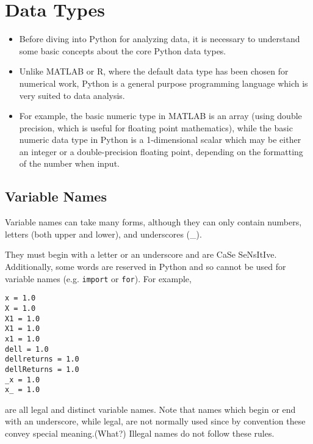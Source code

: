 \documentclass[KSmain.tex]{subfiles}
\begin{document}
 






\section{Data Types}
\begin{itemize}
\item Before diving into Python for analyzing data, it is necessary to 
understand some basic concepts about the core Python data types.

\item Unlike MATLAB or R, where the default data type has been chosen for numerical work, Python is 
 a general purpose programming language which is very suited to data analysis.

\item For example,
the basic numeric type in MATLAB is an array (using double precision, which is useful for floating point
mathematics), while the basic numeric data type in Python is a 1-dimensional scalar which may be either
an integer or a double-precision floating point, depending on the formatting of the number when input.
\end{itemize}

\subsection{ Variable Names}
Variable names can take many forms, although they can only contain numbers, letters (both upper and
lower), and underscores (\_). 

They must begin with a letter or an underscore and are CaSe SeNsItIve.
Additionally, some words are reserved in Python and so cannot be used for variable names (e.g. \texttt{import} or \texttt{for}). For example,

\begin{framed}
\begin{verbatim}
x = 1.0
X = 1.0
X1 = 1.0
X1 = 1.0
x1 = 1.0
dell = 1.0
dellreturns = 1.0
dellReturns = 1.0
_x = 1.0
x_ = 1.0
\end{verbatim}
\end{framed}

are all legal and distinct variable names. Note that names which begin or end with an underscore, while
legal, are not normally used since by convention these convey special meaning.(What?) Illegal names do not
follow these rules.
\newpage
\end{document}
